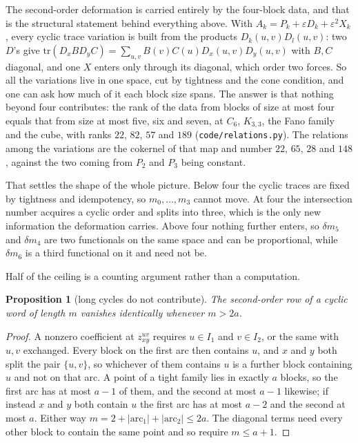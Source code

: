 \documentclass[11pt]{article}
\newtheorem{proposition}[theorem]{Proposition}
\theoremstyle{remark}
\begin{document}
The second-order deformation is carried entirely by the four-block data, and that is the structural
statement behind everything above. With $A_k=P_k+\varepsilon D_k+\varepsilon^2X_k$, every cyclic
trace variation is built from the products $D_k(u,v)D_l(u,v)$: two $D$'s give
$\mathrm{tr}(D_xBD_yC)=\sum_{u,v}B(v)C(u)D_x(u,v)D_y(u,v)$ with $B,C$ diagonal, and one $X$ enters
only through its diagonal, which order two forces. So all the variations live in one space, cut by
tightness and the cone condition, and one can ask how much of it each block size spans. The answer is
that nothing beyond four contributes: the rank of the data from blocks of size at most four equals
that from size at most five, six and seven, at $C_6$, $K_{3,3}$, the Fano family and the cube, with
ranks $22$, $82$, $57$ and $189$ (\texttt{code/relations.py}). The relations among the variations are
the cokernel of that map and number $22$, $65$, $28$ and $148$, against the two coming from $P_2$ and
$P_3$ being constant.

That settles the shape of the whole picture. Below four the cyclic traces are fixed by tightness and
idempotency, so $m_0,\dots,m_3$ cannot move. At four the intersection number acquires a cyclic order
and splits into three, which is the only new information the deformation carries. Above four nothing
further enters, so $\delta m_5$ and $\delta m_4$ are two functionals on the same space and can be
proportional, while $\delta m_6$ is a third functional on it and need not be.

Half of the ceiling is a counting argument rather than a computation.

\begin{proposition}[long cycles do not contribute]\label{prop:arcbound}
The second-order row of a cyclic word of length $m$ vanishes identically whenever $m>2a$.
\end{proposition}

\begin{proof}
A nonzero coefficient at $z^{uv}_{xy}$ requires $u\in I_1$ and $v\in I_2$, or the same with $u,v$
exchanged. Every block on the first arc then contains $u$, and $x$ and $y$ both split the pair
$\{u,v\}$, so whichever of them contains $u$ is a further block containing $u$ and not on that arc.
A point of a tight family lies in exactly $a$ blocks, so the first arc has at most $a-1$ of them, and
the second at most $a-1$ likewise; if instead $x$ and $y$ both contain $u$ the first arc has at most
$a-2$ and the second at most $a$. Either way $m=2+|\text{arc}_1|+|\text{arc}_2|\le2a$. The diagonal
terms need every other block to contain the same point and so require $m\le a+1$.
\end{proof}
\end{document}
